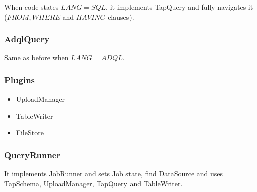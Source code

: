 When code states $LANG=SQL$, it implements TapQuery and fully navigates it ($FROM, WHERE$ and $HAVING$ clauses).

\subsubsection{AdqlQuery}

Same as before when $LANG=ADQL$.

\subsubsection{Plugins}

\begin{itemize}
\item UploadManager
\item TableWriter
\item FileStore
\end{itemize}


\subsubsection{QueryRunner}

It implements JobRunner and sets Job state, find DataSource and uses TapSchema, UploadManager, TapQuery and TableWriter.

